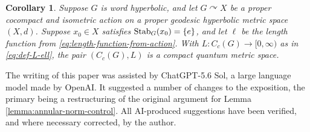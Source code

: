 \documentclass[12pt,a4paper,oneside,final,reqno]{amsart}
\def\acts{\curvearrowright}
\theoremstyle{plain}
\newtheorem{corollary}[theorem]{Corollary}
\theoremstyle{definition}
\begin{document}
\begin{corollary}
    Suppose $G$ is word hyperbolic, and let $G \acts X$ be a proper cocompact and isometric action on a proper geodesic hyperbolic metric space $(X,d)$. Suppose $x_0 \in X$ satisfies ${\rm Stab}_G(x_0) = \{e\}$, and let $\ell$ be the length function from 
    \eqref{eq:length-function-from-action}. With $L \colon C_c(G) \to [0,\infty)$ as in \eqref{eq:def-L-ell}, the pair $(C_c(G), L)$ is a compact quantum metric space.
\end{corollary}












 \vspace{1cm}

  The writing of this paper was assisted by ChatGPT-5.6 Sol, a large language model made by OpenAI. It  suggested a number of changes to the exposition, the primary being a restructuring of the original argument for Lemma \ref{lemma:annular-norm-control}. All AI-produced suggestions have been verified, and where necessary corrected, by the author. 

\printbibliography
\end{document}
